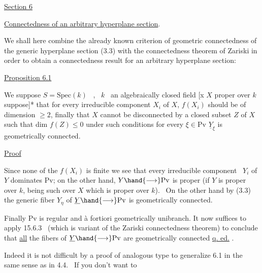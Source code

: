 
\uline{Section 6}

\uline{Connectedness of an arbitrary hyperplane section}.

We shall here combine the already known criterion of
geometric connectedness of the generic hyperplane section (3.3)
with the connectedness theorem of Zariski in order to obtain a
connectedness result for an arbitrary hyperplane section:

\uline{Proposition 6.1}

We suppose $S = \mathrm{Spec}(k)$ \ , \ $k$ \ an algebraically closed
field [x $X$ proper over $k$ suppose]* that for every irreducible
component $X_i$ of $X$, $f(X_i)$ should be of dimension $\geq 2$, finally that $X$
cannot be disconnected by a closed subset $Z$ of $X$ such that dim
$f(Z) \leq 0$ under such conditions for every $\xi \in \mathrm{Pv}$ \quad $\underline{Y}_{\xi}$ is
geometrically connected.

\uline{Proof}

Since none of the $f(X_i)$ is finite we see that every
irreducible component \ $Y_i$ of $Y$ dominates Pv; on the other hand,
$Y \hand{\longrightarrow} \mathrm{Pv}$ is proper (if $Y$ is proper over $k$, being such over $X$ which
is proper over $k$). \ On the other hand by (3.3) the generic fiber $Y_{\eta}$
of $\underline{Y} \hand{\longrightarrow} \mathrm{Pv}$ is geometrically connected.

Finally Pv is regular and à fortiori geometrically unibranch.
It now suffices to apply 15.6.3 \ (which is variant of the Zariski
connectedness theorem) to conclude that \uline{all} the fibers of $\underline{Y} \hand{\longrightarrow} \mathrm{Pv}$
are geometrically connected \uline{q. ed.} .

Indeed it is not difficult by a proof of analogous type to
generalize 6.1 in the same sense as in 4.4. \ If you don't want to
